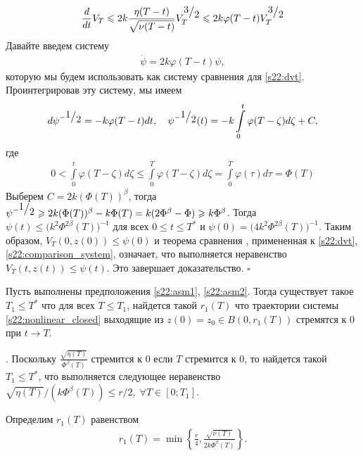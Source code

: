 \documentclass[../main.tex]{subfiles}
\begin{document}
\begin{gather}\label{s22:dvt}
 \frac{d}{dt}V_T \leqslant 2 k \frac{\eta(T-t)}{\sqrt{\nu(T-t)}}V_T^{\frc{3}{2}} \leqslant 2k \varphi(T-t) V_T^{\frc{3}{2}}
\end{gather}
Давайте введем систему
\begin{gather}\label{s22:comparison_system}
 \dot{\psi} = 2k \varphi(T-t) \psi,
\end{gather}
которую мы будем использовать как систему сравнения для \eqref{s22:dvt}. 
Проинтегрировав эту систему, мы имеем
\begin{gather*}
 d\psi^{-\frc{1}{2}} = -k \varphi(T-t) dt, \quad
 \psi^{-\frc{1}{2}}(t) = -k \int\limits_0^t \varphi(T-\zeta) d\zeta + C,
\end{gather*}
где
\begin{gather*}
 0 < \int\limits_0^t \varphi(T-\zeta) d\zeta \leqslant \int\limits_0^T \varphi(T-\zeta) d\zeta = 
 \int\limits_0^T \varphi(\tau) d\tau = \Phi(T) 
\end{gather*}
Выберем $C = 2k (\Phi(T))^{\beta}$, тогда $\psi^{-\frc{1}{2}} \geqslant 2k (\Phi(T))^{\beta} - k \Phi(T) = k (2\Phi^\beta - \Phi)\geqslant k\Phi^\beta $.
Тогда $\psi(t) \leqslant \big(k^2\Phi^{2\beta}(T)\big)^{-1}$ для всех $ 0 \leqslant t \leqslant T^* $ и $\psi(0) = \big(4k^2\Phi^{2\beta}(T)\big)^{-1} $.
Таким образом, $V_T(0,z(0))\leqslant \psi(0)$ и теорема сравнения \cite{walter}, примененная к \eqref{s22:dvt}, \eqref{s22:comparison_system}, означает, что выполняется неравенство $V_T(t,z(t))\leqslant \psi(t)$. 
Это завершает доказательство.
 \hfill $ \square $

\begin{theorem}\label{s22:th:tends_to_zero}
 Пусть выполнены предположения \ref{s22:asm1}, \ref{s22:asm2}. 
Тогда существует такое $ T_1 \leqslant T^*$ что для всех $ T \leqslant T_1$, найдется такой $ r_1(T)$ что траектории системы \eqref{s22:nonlinear_closed} выходящие из $z(0) = z_0 \in B(0,r_1(T))$ стремятся к $0$ при $t \to T$.
\end{theorem}

\doc. 
Поскольку $\frac{\sqrt{\eta(T)}}{\Phi^\beta(T)} $ стремится к $0$ если $T$ стремится к $0$, то найдется такой $ T_1 \leqslant T^*$, что выполняется следующее неравенство
$ \sqrt{\eta(T)}/(k\Phi^\beta(T)) \leqslant r/{2}, \; \forall T \in [0;T_1]$.

Определим $r_1(T)$ равенством
\begin{gather}\label{s22:r1}
 r_1(T) = \min \left\{ \frac{r}{4}, \frac{\sqrt{\nu(T)}}{2k\Phi^\beta(T)} \right\}.
\end{gather}
\end{document}
